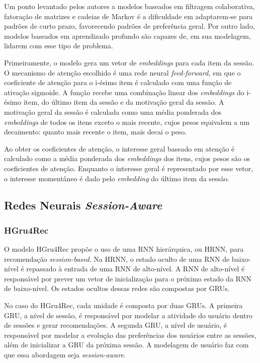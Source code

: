 Um ponto levantado pelos autores a modelos baseados em filtragem colaborativa,
fatoração de matrizes e cadeias de Markov é a dificuldade em adaptarem-se para
padrões de curto prazo, favorecendo padrões de preferência geral. Por outro
lado, modelos baseados em aprendizado profundo são capazes de, em sua modelagem,
lidarem com esse tipo de problema.

Primeiramente, o modelo gera um vetor de \textit{embeddings} para cada item da
sessão. O mecanismo de atenção escolhido é uma rede neural \textit{feed-forward}, em que
o coeficiente de atenção para o i-ésimo item é calculado com uma função de
ativação sigmoide. A função recebe uma combinação linear dos \textit{embeddings} do
i-ésimo item, do último item da sessão e da motivação geral da sessão. A
motivação geral da sessão é calculada como uma média ponderada dos
\textit{embeddings} de todos os itens exceto o mais recente, cujos pesos
equivalem a um decaimento: quanto mais recente o item, mais decai o peso.

Ao obter os coeficientes de atenção, o interesse geral baseado em atenção é
calculado como a média ponderada dos \textit{embeddings} dos itens, cujos pesos
são os coeficientes de atenção. Enquanto o interesse geral é representado por
esse vetor, o interesse momentâneo é dado pelo \textit{embedding} do último item
da sessão. 

\subsection{Redes Neurais \textit{Session-Aware}}

\subsubsection{HGru4Rec}

O modelo HGru4Rec propõe o uso de uma RNN hierárquica, ou HRNN, para
recomendação \textit{session-based}. Na HRNN, o estado oculto de uma RNN de
baixo-nível é repassado à entrada de uma RNN de alto-nível. A RNN de alto-nível
é responsável por prever um vetor de inicialização para o próximo estado da RNN
de baixo-nível. Os estados ocultos dessas redes são compostas por GRUs.

No caso do HGru4Rec, cada unidade é composta por duas GRUs. A primeira GRU, a
nível de sessão, é responsável por modelar a atividade do usuário dentro de
sessões e gerar recomendações. A segunda GRU, a nível de usuário, é responsável
por modelar a evolução das preferências dos usuários entre as sessões, além de
inicializar a GRU da próxima sessão. A modelagem de usuário faz com que essa abordagem
seja \textit{session-aware}.

